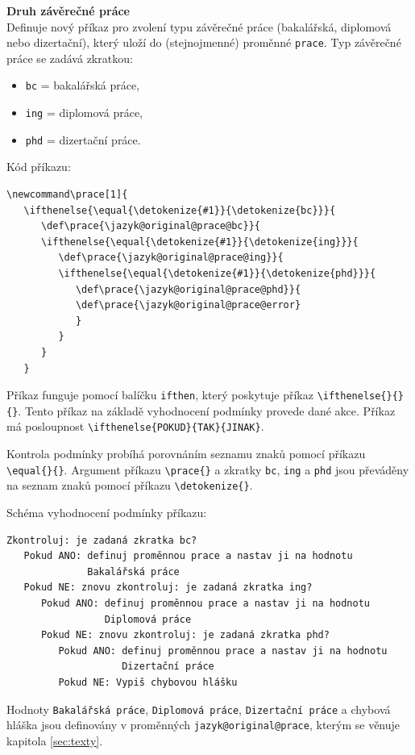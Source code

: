 \textbf{Druh závěrečné práce}\\
Definuje nový příkaz pro zvolení typu závěrečné práce (bakalářská, diplomová nebo dizertační), který uloží do (stejnojmenné) proměnné \verb|prace|. Typ závěrečné práce se zadává zkratkou: 

\begin{itemize}[label={-}]
	\item \verb|bc| = bakalářská práce,
	\item \verb|ing| = diplomová práce,
	\item \verb|phd| = dizertační práce.
\end{itemize}

Kód příkazu:
\begin{verbatim}
\newcommand\prace[1]{
   \ifthenelse{\equal{\detokenize{#1}}{\detokenize{bc}}}{
      \def\prace{\jazyk@original@prace@bc}}{
      \ifthenelse{\equal{\detokenize{#1}}{\detokenize{ing}}}{
         \def\prace{\jazyk@original@prace@ing}}{
         \ifthenelse{\equal{\detokenize{#1}}{\detokenize{phd}}}{
            \def\prace{\jazyk@original@prace@phd}}{
            \def\prace{\jazyk@original@prace@error}
            }
         }
      }
   }
\end{verbatim}

Příkaz funguje pomocí balíčku \verb|ifthen|, který poskytuje příkaz \verb|\ifthenelse{}{}{}|. Tento příkaz na základě vyhodnocení podmínky provede dané akce. Příkaz má posloupnost \verb|\ifthenelse{POKUD}{TAK}{JINAK}|.

Kontrola podmínky probíhá porovnáním seznamu znaků pomocí příkazu \verb|\equal{}{}|. Argument příkazu \verb|\prace{}| a zkratky \verb|bc|, \verb|ing| a \verb|phd| jsou převáděny na seznam znaků pomocí příkazu \verb|\detokenize{}|.

Schéma vyhodnocení podmínky příkazu:

\begin{verbatim}
Zkontroluj: je zadaná zkratka bc?
   Pokud ANO: definuj proměnnou prace a nastav ji na hodnotu
              Bakalářská práce
   Pokud NE: znovu zkontroluj: je zadaná zkratka ing?
      Pokud ANO: definuj proměnnou prace a nastav ji na hodnotu
                 Diplomová práce
      Pokud NE: znovu zkontroluj: je zadaná zkratka phd?
         Pokud ANO: definuj proměnnou prace a nastav ji na hodnotu
                    Dizertační práce
         Pokud NE: Vypiš chybovou hlášku
\end{verbatim}

Hodnoty \verb|Bakalářská práce|, \verb|Diplomová práce|, \verb|Dizertační práce| a chybová hláška jsou definovány v proměnných \verb|jazyk@original@prace|, kterým se věnuje kapitola \ref{sec:texty}.

